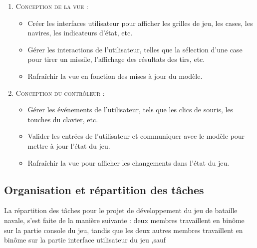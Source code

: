 \documentclass{rapport}
\begin{document}
{\begin{enumerate}
\begin{itemize}
\end{itemize}


\item \textsc{Conception de la vue } :


\begin{itemize}


\item Créer les interfaces utilisateur pour afficher les grilles de jeu, les cases, les navires, les indicateurs d'état, etc.


\item Gérer les interactions de l'utilisateur, telles que la sélection d'une case pour tirer un missile, l'affichage des résultats des tirs, etc.


\item Rafraîchir la vue en fonction des mises à jour du modèle.


\end{itemize}


\item \textsc{Conception du contrôleur } :


\begin{itemize}


\item Gérer les événements de l'utilisateur, tels que les clics de souris, les touches du clavier, etc.


\item Valider les entrées de l'utilisateur et communiquer avec le modèle pour mettre à jour l'état du jeu.


\item Rafraîchir la vue pour afficher les changements dans l'état du jeu.



\end{itemize}






\end{enumerate}




\subsection{Organisation et répartition des tâches}


La répartition des tâches pour le projet de développement du jeu de bataille navale, s'est faite de la manière suivante : deux membres travaillent en binôme sur la partie console du jeu, tandis que les deux autres membres travaillent en binôme sur la partie interface utilisateur du jeu ,sauf


}
\end{document}
